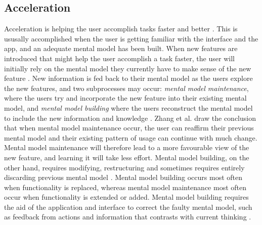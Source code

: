 \subsection{Acceleration}
Acceleration is helping the user accomplish tasks faster and better \cite{Bradt2009}. This is ususally accomplished when the user is getting familiar with the interface and the app, and an adequate mental model has been built. When new features are introduced that might help the user accomplish a task faster, the user will initially rely on the mental model they currently have to make sense of the new feature \cite{Orlikowski2000}. New information is fed back to their mental model as the users explore the new features, and two subprocesses may occur: \textit{mental model maintenance}, where the users try and incorporate the new feature into their existing mental model, and \textit{mental model building} where the users reconstruct the mental model to include the new information and knowledge \cite{Vandenbosch1996}. Zhang et al. \cite{Zhang2011} draw the conclusion that when mental model maintenance occur, the user can reaffirm their previous mental model and their existing pattern of usage can continue with much change. Mental model maintenance will therefore lead to a more favourable view of the new feature, and learning it will take less effort. Mental model building, on the other hand, requires modifying, restructuring and sometimes requires entirely discarding previous mental model \cite{Vandenbosch1996}. Mental model building occurs most often when functionality is replaced, whereas mental model maintenance most often occur when functionality is extended or added. Mental model building requires the aid of the application and interface to correct the faulty mental model, such as feedback from actions and information that contrasts with current thinking \cite{Hsu2011}.

